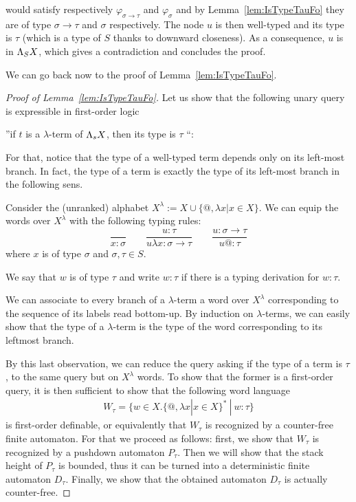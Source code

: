 would satisfy respectively $\varphi_{\sigma\rightarrow\tau}$ and  $\varphi_{\sigma}$ and by Lemma~\ref{lem:IsTypeTauFo} they are of type $\sigma\rightarrow\tau$ and $\sigma$ respectively. The node $u$ is then well-typed and its type is $\tau$ (which is a type of $S$ thanks to downward closeness). As a consequence, $u$ is in $\Lambda_{S} X$, which gives a contradiction and concludes the proof.
 \smallskip
 
We can go back now to the proof of Lemma~\ref{lem:IsTypeTauFo}.
\begin{proof}[Proof of Lemma~\ref{lem:IsTypeTauFo}]
Let us show that the following unary query is expressible in first-order logic
\begin{center}
''if $t$ is a $\lambda$-term of $\Lambda_{s} X$, then its type is $\tau$ ``:
\end{center}
 For that, notice that the type of a well-typed term depends only on its left-most branch. In fact, the type of a term is exactly the type of its left-most branch in the following sens.

Consider the (unranked) alphabet $ X^\lambda:= X\cup \{@, \lambda x | x\in X\}$. We can equip the words over $X^\lambda$ with the following typing rules:
$$\frac{}{x: \sigma} \qquad \frac{u:\tau}{u\lambda x: \sigma\rightarrow \tau} \qquad \frac{u:\sigma\rightarrow\tau}{u@:\tau}$$
where $x$ is of type $\sigma$ and $\sigma,\tau \in S$.

We say that $w$ is of type $\tau$ and write $w:\tau$ if there is a typing derivation for $w:\tau$.

We can associate to every branch of a $\lambda$-term a word over $X^\lambda$ corresponding to the sequence of its labels read bottom-up. By induction on $\lambda$-terms, we can easily show that the type of a $\lambda$-term is the type of the word corresponding to its leftmost branch. 

By this last observation, we can reduce the query asking if the type of a term is $\tau$, to the same query but on $X^\lambda$ words. To show that the former is a first-order query, it is then sufficient to show that the following word language 
\begin{align*}
W_\tau = \{w\in X.\{@, \lambda x | x\in X\}^*\ |\ w:\tau \} 
\end{align*}
is first-order definable, or equivalently that  $W_\tau$ is recognized by a counter-free  finite automaton. For that we proceed as follows: first, we show that $W_\tau$ is recognized by a pushdown automaton $P_\tau$. Then we will show that the stack height of $P_\tau$ is bounded, thus it can be turned into a deterministic finite automaton $D_\tau$. Finally, we show that the obtained automaton $D_\tau$ is actually counter-free.  


\end{proof}

